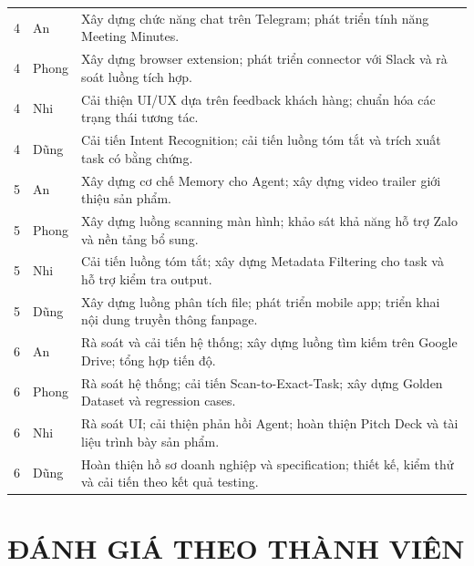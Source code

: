 \documentclass[12pt,a4paper]{article}
\begin{document}
\begin{longtable}{@{}C{1.2cm}P{3.0cm}P{11.8cm}@{}}
4 & An & Xây dựng chức năng chat trên Telegram; phát triển tính năng Meeting Minutes.\\
4 & Phong & Xây dựng browser extension; phát triển connector với Slack và rà soát luồng tích hợp.\\
4 & Nhi & Cải thiện UI/UX dựa trên feedback khách hàng; chuẩn hóa các trạng thái tương tác.\\
4 & Dũng & Cải tiến Intent Recognition; cải tiến luồng tóm tắt và trích xuất task có bằng chứng.\\

5 & An & Xây dựng cơ chế Memory cho Agent; xây dựng video trailer giới thiệu sản phẩm.\\
5 & Phong & Xây dựng luồng scanning màn hình; khảo sát khả năng hỗ trợ Zalo và nền tảng bổ sung.\\
5 & Nhi & Cải tiến luồng tóm tắt; xây dựng Metadata Filtering cho task và hỗ trợ kiểm tra output.\\
5 & Dũng & Xây dựng luồng phân tích file; phát triển mobile app; triển khai nội dung truyền thông fanpage.\\

6 & An & Rà soát và cải tiến hệ thống; xây dựng luồng tìm kiếm trên Google Drive; tổng hợp tiến độ.\\
6 & Phong & Rà soát hệ thống; cải tiến Scan-to-Exact-Task; xây dựng Golden Dataset và regression cases.\\
6 & Nhi & Rà soát UI; cải thiện phản hồi Agent; hoàn thiện Pitch Deck và tài liệu trình bày sản phẩm.\\
6 & Dũng & Hoàn thiện hồ sơ doanh nghiệp và specification; thiết kế, kiểm thử và cải tiến theo kết quả testing.\\

\end{longtable}

\section{ĐÁNH GIÁ THEO THÀNH VIÊN}
\end{document}
